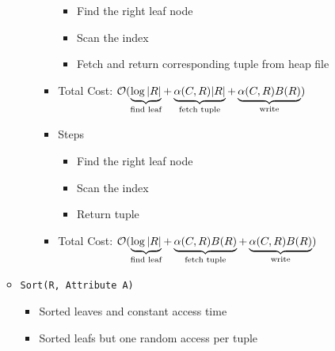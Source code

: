 \begin{itemize}
\begin{itemize}
\begin{itemize}
\begin{itemize}
\begin{itemize}
                                    \item Find the right leaf node
                                    \item Scan the index
                                    \item Fetch and return corresponding tuple from heap file
                                \end{itemize}
                            \item Total Cost: $\mathcal{O}(\underbrace{\log |R|}_{\text{find leaf}} + \underbrace{\alpha(C, R) |R|}_{\text{fetch tuple}} + \underbrace{\alpha(C, R)B(R)}_{\text{write}})$
                        \end{itemize}
                        \begin{itemize}
                            \item Steps
                                \begin{itemize}
                                    \item Find the right leaf node
                                    \item Scan the index
                                    \item Return tuple
                                \end{itemize}
                            \item Total Cost: $\mathcal{O}(\underbrace{\log |R|}_{\text{find leaf}} + \underbrace{\alpha(C, R) B(R)}_{\text{fetch tuple}} + \underbrace{\alpha(C, R)B(R)}_{\text{write}})$
                        \end{itemize}
                \end{itemize}
        \end{itemize}
        \begin{itemize}
            \item \verb+Sort(R, Attribute A)+
                \begin{itemize}
                    \item Sorted leaves and constant access time
                \end{itemize}
                \begin{itemize}
                    \item Sorted leafs but one random access per tuple
                \end{itemize}

\end{itemize}
\end{itemize}
